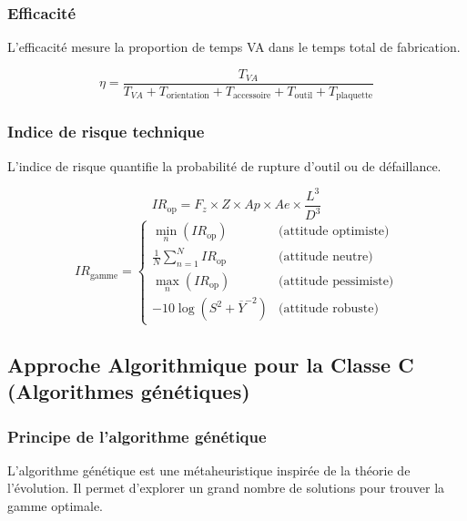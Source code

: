 \documentclass{article}
\begin{document}
\begin{table}[h]
\subsubsection{Efficacité}

L'efficacité mesure la proportion de temps VA dans le temps total de fabrication.

\begin{tcolorbox}[colback=vertclair, colframe=green!50!black, title=Calcul de l'efficacité]
\[
\eta = \frac{T_{VA}}{T_{VA} + T_{\text{orientation}} + T_{\text{accessoire}} + T_{\text{outil}} + T_{\text{plaquette}}}
\]
\end{tcolorbox}

\subsubsection{Indice de risque technique}

L'indice de risque quantifie la probabilité de rupture d'outil ou de défaillance.

\begin{tcolorbox}[colback=orangeclair, colframe=orange!70!black, title=Calcul de l'indice de risque]
\[
IR_{\text{op}} = F_z \times Z \times Ap \times Ae \times \frac{L^3}{D^3}
\]
\[
IR_{\text{gamme}} = 
\begin{cases}
\min_n(IR_{\text{op}}) & \text{(attitude optimiste)} \\
\displaystyle \frac{1}{N}\sum_{n=1}^N IR_{\text{op}} & \text{(attitude neutre)} \\
\max_n(IR_{\text{op}}) & \text{(attitude pessimiste)} \\
-10\log(S^2 + \overline{Y}^{-2}) & \text{(attitude robuste)}
\end{cases}
\]
\end{tcolorbox}

\subsection{Approche Algorithmique pour la Classe C (Algorithmes génétiques)}

\subsubsection{Principe de l'algorithme génétique}

L'algorithme génétique est une métaheuristique inspirée de la théorie de l'évolution. Il permet d'explorer un grand nombre de solutions pour trouver la gamme optimale.


\end{table}
\end{document}
